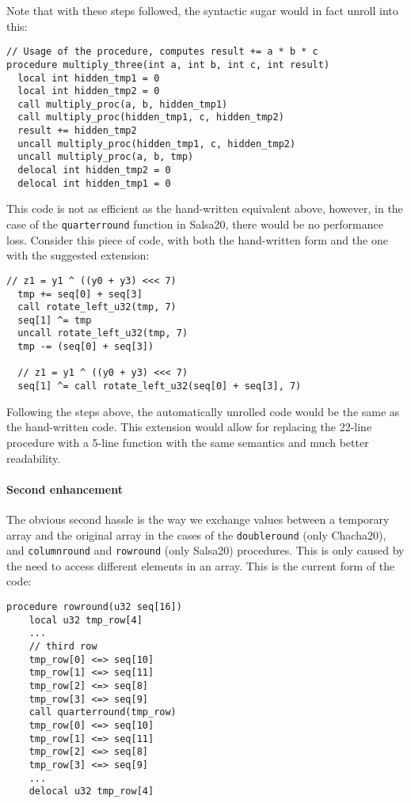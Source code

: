 \documentclass[a4paper,10pt,openright]{memoir}
\newcommand{\code}[1]{\texttt{#1}}
\begin{document}
Note that with these steps followed, the syntactic sugar would in fact 
unroll into this:

\begin{lstlisting}[language=Janus]
// Usage of the procedure, computes result += a * b * c
procedure multiply_three(int a, int b, int c, int result)
  local int hidden_tmp1 = 0
  local int hidden_tmp2 = 0
  call multiply_proc(a, b, hidden_tmp1)
  call multiply_proc(hidden_tmp1, c, hidden_tmp2)
  result += hidden_tmp2
  uncall multiply_proc(hidden_tmp1, c, hidden_tmp2)
  uncall multiply_proc(a, b, tmp)
  delocal int hidden_tmp2 = 0
  delocal int hidden_tmp1 = 0
\end{lstlisting}

This code is not as efficient as the hand-written equivalent above, 
however, in the case of the \code{quarterround} function in Salsa20, 
there would be no performance loss. Consider this piece of code, 
with both the hand-written form and the one with the suggested 
extension:

\begin{lstlisting}[language=Janus]
  // z1 = y1 ^ ((y0 + y3) <<< 7)
  tmp += seq[0] + seq[3]
  call rotate_left_u32(tmp, 7)
  seq[1] ^= tmp
  uncall rotate_left_u32(tmp, 7)
  tmp -= (seq[0] + seq[3])
  
  // z1 = y1 ^ ((y0 + y3) <<< 7)
  seq[1] ^= call rotate_left_u32(seq[0] + seq[3], 7)
\end{lstlisting}

Following the steps above, the automatically unrolled code would be the 
same as the hand-written code. This extension would allow for replacing 
the 22-line procedure with a 5-line function with the same semantics 
and much better readability.

\paragraph{Second enhancement}

The obvious second hassle is the way we exchange values between 
a temporary array and the original array in the cases of the 
\code{doubleround} (only Chacha20), and \code{columnround} and 
\code{rowround} (only Salsa20) procedures. This is only caused by the 
need to access different elements in an array. This is the current form 
of the code:

\begin{lstlisting}[language=Janus]
procedure rowround(u32 seq[16])
	local u32 tmp_row[4]
	...
	// third row
	tmp_row[0] <=> seq[10]
	tmp_row[1] <=> seq[11]
	tmp_row[2] <=> seq[8]
	tmp_row[3] <=> seq[9]
	call quarterround(tmp_row)
	tmp_row[0] <=> seq[10]
	tmp_row[1] <=> seq[11]
	tmp_row[2] <=> seq[8]
	tmp_row[3] <=> seq[9]
	...
	delocal u32 tmp_row[4]
\end{lstlisting}
\end{document}
